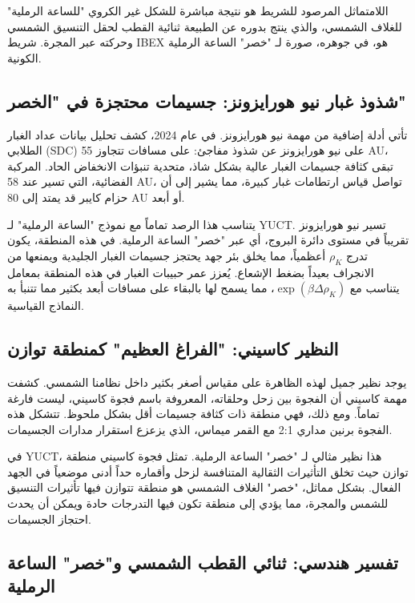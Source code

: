 \documentclass[11pt,a4paper]{article}
\theoremstyle{remark}
\begin{document}
	اللامتماثل المرصود للشريط هو نتيجة مباشرة للشكل غير الكروي "للساعة الرملية" للغلاف الشمسي، والذي ينتج بدوره عن الطبيعة ثنائية القطب لحقل التنسيق الشمسي وحركته عبر المجرة. شريط IBEX هو، في جوهره، صورة لـ "خصر" الساعة الرملية الكونية.
	
	\subsection{شذوذ غبار نيو هورايزونز: جسيمات محتجزة في "الخصر"}
	\label{subsec:coord:newhorizons}
	
	تأتي أدلة إضافية من مهمة نيو هورايزونز. في عام 2024، كشف تحليل بيانات عداد الغبار الطلابي (SDC) على نيو هورايزونز عن شذوذ مفاجئ: على مسافات تتجاوز 55 AU، تبقى كثافة جسيمات الغبار عالية بشكل شاذ، متحدية تنبؤات الانخفاض الحاد. المركبة الفضائية، التي تسير عند 58 AU، تواصل قياس ارتطامات غبار كبيرة، مما يشير إلى أن حزام كايبر قد يمتد إلى 80 AU أو أبعد.
	
	يتناسب هذا الرصد تماماً مع نموذج "الساعة الرملية" لـ YUCT. تسير نيو هورايزونز تقريباً في مستوى دائرة البروج، أي عبر "خصر" الساعة الرملية. في هذه المنطقة، يكون تدرج \(\rho_K\) أعظمياً، مما يخلق بئر جهد يحتجز جسيمات الغبار الجليدية ويمنعها من الانجراف بعيداً بضغط الإشعاع. يُعزز عمر حبيبات الغبار في هذه المنطقة بمعامل يتناسب مع \(\exp(\beta \Delta \rho_K)\)، مما يسمح لها بالبقاء على مسافات أبعد بكثير مما تتنبأ به النماذج القياسية.
	
	\subsection{النظير كاسيني: "الفراغ العظيم" كمنطقة توازن}
	\label{subsec:coord:cassini}
	
	يوجد نظير جميل لهذه الظاهرة على مقياس أصغر بكثير داخل نظامنا الشمسي. كشفت مهمة كاسيني أن الفجوة بين زحل وحلقاته، المعروفة باسم فجوة كاسيني، ليست فارغة تماماً. ومع ذلك، فهي منطقة ذات كثافة جسيمات أقل بشكل ملحوظ. تتشكل هذه الفجوة برنين مداري 2:1 مع القمر ميماس، الذي يزعزع استقرار مدارات الجسيمات.
	
	في YUCT، هذا نظير مثالي لـ "خصر" الساعة الرملية. تمثل فجوة كاسيني منطقة توازن حيث تخلق التأثيرات الثقالية المتنافسة لزحل وأقماره حداً أدنى موضعياً في الجهد الفعال. بشكل مماثل، "خصر" الغلاف الشمسي هو منطقة تتوازن فيها تأثيرات التنسيق للشمس والمجرة، مما يؤدي إلى منطقة تكون فيها التدرجات حادة ويمكن أن يحدث احتجاز الجسيمات.
	
	\subsection{تفسير هندسي: ثنائي القطب الشمسي و"خصر" الساعة الرملية}
	\label{subsec:coord:dipole_geometry}
	
\end{document}
